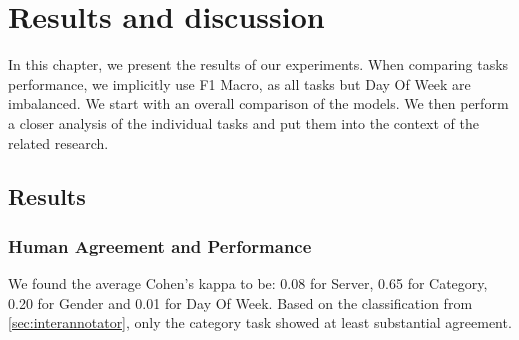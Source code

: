 \chapter{Results and discussion}
\label{chap:results}
In this chapter, we present the results of our experiments.
When comparing tasks performance, we implicitly use F1 Macro, as
all tasks but Day Of Week are imbalanced. We start with an overall
comparison of the models. We then perform a closer analysis of the
individual tasks and put them into the context of the related research.

\section{Results}
\subsection{Human Agreement and Performance}
\label{sec:results}
\begin{table}[h]
\end{table}
\label{sec:human-baseline}
We found the average Cohen's kappa to be: 0.08 for Server, 0.65 for Category,
0.20 for Gender and 0.01 for Day Of Week. Based on the classification from \autoref{sec:interannotator},
only the category task showed at least substantial agreement.

